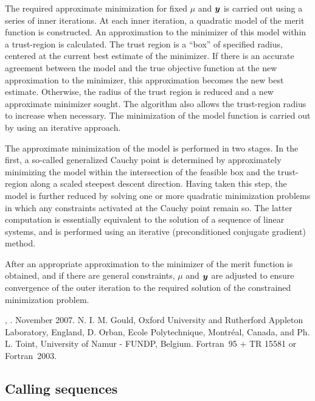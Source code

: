 \documentclass{galahad}
\newcommand{\fullpackagename}{LANC\-E\-LOT\-\_simple}
\begin{document}
The required approximate minimization for fixed $\mu$ and ${\bm{y}}$ is
carried out using a series of inner iterations.  At each inner
iteration, a quadratic model of the merit function is
constructed.  An approximation to the minimizer of this model within a
trust-region is calculated.  The trust region is a ``box''
of specified radius, centered at the current best estimate
of the minimizer.  If there is an accurate agreement between the model
and the true objective function at the new approximation to the
minimizer, this approximation becomes the new best estimate.  Otherwise,
the radius of the trust region is reduced and a new approximate
minimizer sought.  The algorithm also allows the trust-region radius to
increase when necessary. The minimization of the model function is
carried out by using an iterative approach.

The approximate minimization of the model is performed in two stages.
In the first, a so-called generalized Cauchy point is determined
by approximately minimizing the model within the intersection of
the feasible box and the trust-region along a scaled steepest descent
direction. Having taken this step, the model is further reduced
by solving one or more quadratic minimization problems in which
any constraints activated at the Cauchy point remain so. The latter
computation is essentially equivalent to the solution of a sequence
of linear systems, and is performed using an iterative (preconditioned
conjugate gradient) method.

After an appropriate approximation to the minimizer of the merit
function is obtained, and if there are general constraints,
$\mu$ and ${\bm{y}}$ are adjusted to ensure
convergence of the outer iteration to the required solution of the
constrained minimization problem.


\galattributes
\galversions{\tt  \fullpackagename\_double},
.
\galdate November 2007.
\galorigin N. I. M. Gould, Oxford University and Rutherford Appleton Laboratory,
England, D. Orban, Ecole Polytechnique, Montr\'{e}al, Canada, and
Ph. L. Toint, University of Namur - FUNDP, Belgium.
\gallanguage Fortran~95 + TR 15581 or Fortran~2003.


\galhowto

\subsection{Calling sequences}
\end{document}
